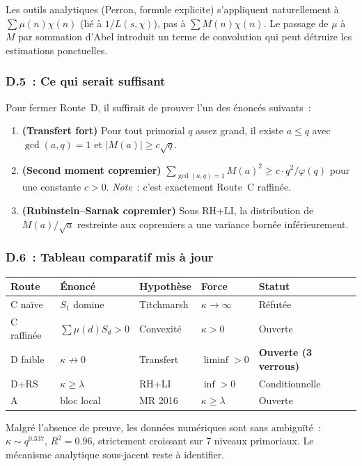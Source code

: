 \begin{remark}[Verrou 3 : $M$ vs $\mu$]\label{rem:V3}
Les outils analytiques (Perron, formule explicite) s'appliquent
naturellement \`a $\sum\mu(n)\chi(n)$ (li\'e \`a $1/L(s,\chi)$),
pas \`a $\sum M(n)\chi(n)$. Le passage de $\mu$ \`a $M$ par
sommation d'Abel introduit un terme de convolution qui peut
d\'etruire les estimations ponctuelles.
\end{remark}

\subsubsection{D.5~: Ce qui serait suffisant}

Pour fermer Route~D, il suffirait de prouver l'un des \'enonc\'es
suivants~:

\begin{enumerate}
\item \textbf{(Transfert fort)} Pour tout primorial $q$ assez grand,
il existe $a\le q$ avec $\gcd(a,q)=1$ et $|M(a)|\ge c\sqrt{q}$.

\item \textbf{(Second moment copremier)} $\sum_{\gcd(a,q)=1}M(a)^2
\ge c\cdot q^2/\varphi(q)$ pour une constante $c>0$.
\emph{Note}~: c'est exactement Route~C raffin\'ee.

\item \textbf{(Rubinstein--Sarnak copremier)} Sous RH+LI,
la distribution de $M(a)/\sqrt{a}$ restreinte aux copremiers
a une variance born\'ee inf\'erieurement.
\end{enumerate}

\subsubsection{D.6~: Tableau comparatif mis \`a jour}

\begin{center}
\begin{tabular}{lllll}
\toprule
\textbf{Route} & \textbf{\'Enonc\'e} & \textbf{Hypoth\`ese} & \textbf{Force} & \textbf{Statut} \\
\midrule
C na\"ive & $S_1$ domine & Titchmarsh & $\kappa\to\infty$ & R\'efut\'ee \\
C raffin\'ee & $\sum\mu(d)S_d>0$ & Convexit\'e & $\kappa>0$ & Ouverte \\
D faible & $\kappa\not\to 0$ & Transfert & $\liminf>0$ & \textbf{Ouverte (3 verrous)} \\
D+RS & $\kappa\ge\lambda$ & RH+LI & $\inf>0$ & Conditionnelle \\
A & bloc local & MR 2016 & $\kappa\ge\lambda$ & Ouverte \\
\bottomrule
\end{tabular}
\end{center}

\begin{remark}
Malgr\'e l'absence de preuve, les donn\'ees num\'eriques sont
sans ambigu\"it\'e~: $\kappa\sim q^{0.337}$, $R^2=0.96$,
strictement croissant sur 7 niveaux primoriaux.
Le m\'ecanisme analytique sous-jacent reste \`a identifier.
\end{remark}

